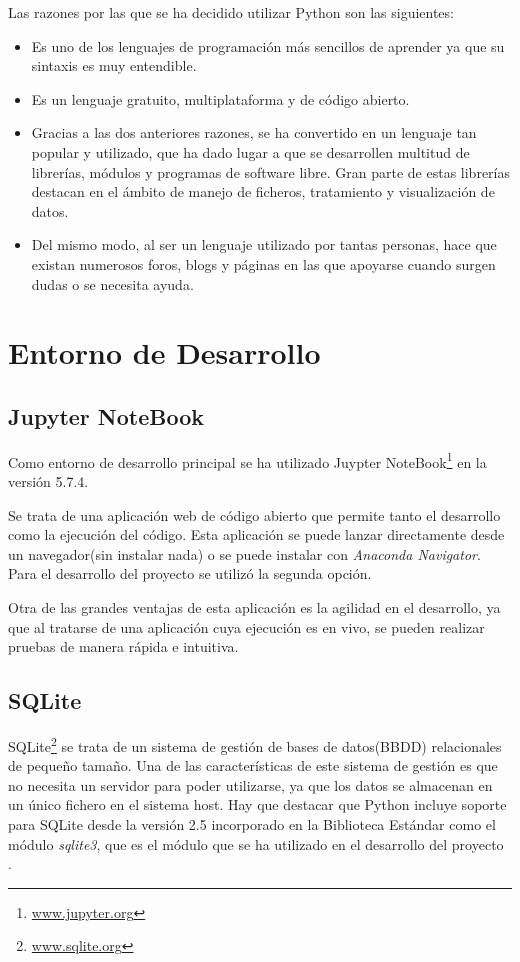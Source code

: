 Las razones por las que se ha decidido utilizar Python son las siguientes:
\begin{itemize}
	\item Es uno de los lenguajes de programación más sencillos de aprender ya que su sintaxis es muy entendible.
	\item Es un lenguaje gratuito, multiplataforma y de código abierto.
	\item Gracias a las dos anteriores razones, se ha convertido en un lenguaje tan popular y utilizado, que ha dado lugar a que se desarrollen multitud de librerías, módulos y programas de software libre. Gran parte de estas librerías destacan en el ámbito de manejo de ficheros, tratamiento y visualización de datos.
	\item Del mismo modo, al ser un lenguaje utilizado por tantas personas, hace que existan numerosos foros, blogs y páginas en las que apoyarse cuando surgen dudas o se necesita ayuda.
\end{itemize}


\section{Entorno de Desarrollo}\label{entorno_de_desarrollo}
\subsection{Jupyter NoteBook}\label{jupyter_noteBook}
Como entorno de desarrollo principal se ha utilizado Juypter NoteBook\footnote{\href {https://jupyter.org/}{www.jupyter.org}} en la versión 5.7.4.

Se trata de una aplicación web de código abierto que permite tanto el desarrollo como la ejecución del código.
Esta aplicación se puede lanzar directamente desde un navegador(sin instalar nada) o se puede instalar con \emph{Anaconda Navigator}. Para el desarrollo del proyecto se utilizó la segunda opción.

Otra de las grandes ventajas de esta aplicación es la agilidad en el desarrollo, ya que al tratarse de una aplicación cuya ejecución es en vivo, se pueden realizar pruebas de manera rápida e intuitiva. 


\subsection{SQLite}\label{sqlite}
SQLite\footnote{\href {https://www.sqlite.org/index.html}{www.sqlite.org}} se trata de un sistema de gestión de bases de datos(BBDD) relacionales de pequeño tamaño.
Una de las características de este sistema de gestión es que no necesita un servidor para poder utilizarse, ya que los datos se almacenan en un único fichero en el sistema host. 
Hay que destacar que Python incluye soporte para SQLite desde la versión 2.5 incorporado en la Biblioteca Estándar como el módulo \emph{sqlite3}, que es el módulo que se ha utilizado en el desarrollo del proyecto \cite{sqlite}.



